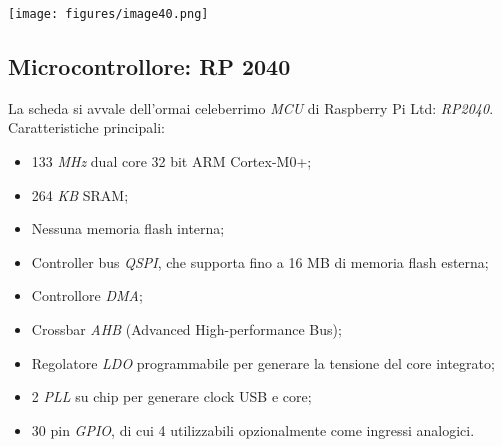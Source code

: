 \begin{center}
\texttt{[image: figures/image40.png]}
\captionsetup{type=figure}
\end{center}

\hypertarget{microcontrollore-rp-2040}{%
\subsection{\texorpdfstring{Microcontrollore: RP
2040}{ Microcontrollore: RP 2040}}\label{microcontrollore-rp-2040}}

La scheda si avvale dell'ormai celeberrimo \emph{MCU} di Raspberry Pi Ltd: \emph{RP2040}.\\
Caratteristiche principali:

\begin{itemize}
\item
  
  133 \emph{MHz} dual core 32 bit ARM Cortex-M0+;
  
\item
  
  264 \emph{KB} SRAM;
  
\item
  
  Nessuna memoria flash interna;
  
\item
  
  Controller bus \emph{QSPI}, che supporta fino a 16 MB di memoria flash
  esterna;
  
\item
  
  Controllore \emph{DMA};
  
\item
  
  Crossbar \emph{AHB} (Advanced High-performance Bus);
  
\item
  
  Regolatore \emph{LDO} programmabile per generare la tensione del core
  integrato;
  
\item
  
  2 \emph{PLL} su chip per generare clock USB e core;
  
\item
  
  30 pin \emph{GPIO}, di cui 4 utilizzabili opzionalmente come ingressi
  analogici.
  
\end{itemize}

